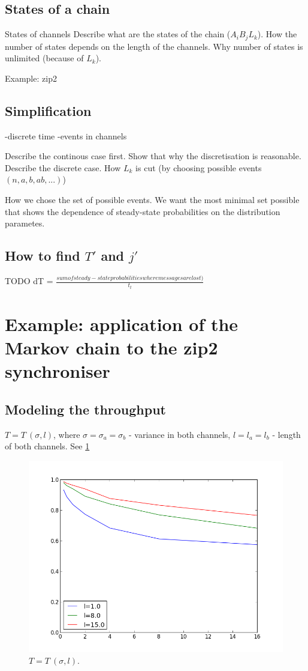   \subsection{States of a chain}
States of channels
Describe what are the states of the chain ($A_{i} B_{j} L_{k}$). How the number of states depends on the length of the channels. Why number of states is unlimited (because of $L_{k}$).

Example: zip2
  \subsection{Simplification}
-discrete time
-events in channels

Describe the continous case first. Show that why the discretisation is reasonable.
Describe the discrete case. How $L_{k}$ is cut (by choosing possible events $(n,a,b,ab,...)$)

How we chose the set of possible events. We want the most minimal set possible that shows the dependence of steady-state probabilities on the distribution parametes.

  \subsection{How to find $T'$ and $j'$}
TODO
dT = $\frac{sum of steady-state probabilities where messages are lost)}{t_{t}}$

\section{Example: application of the Markov chain to the zip2 synchroniser}
  \subsection{Modeling the throughput}
$T = T \: (\sigma, l)$, where $\sigma = \sigma_{a} = \sigma_{b}$ - variance in both channels, $l = l_{a} = l_{b}$ - length of both channels. See \ref{fig:t_s}
    \begin{figure}[here]
    \centering
    \includegraphics[scale=0.4]{figs/thr_(disp,l).png}
    \caption{$T = T \: (\sigma, l)$.}
    \label{fig:t_s}
    \end{figure}

